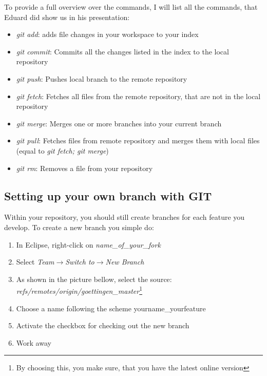 To provide a full overview over the commands, I will list all the commands, that Eduard did show us in his presentation:
\begin{itemize}
 \item \emph{git add}: adds file changes in your workspace to your index
 \item \emph{git commit}: Commits all the changes listed in the index to the local repository
 \item \emph{git push}: Pushes local branch to the remote repository
 \item \emph{git fetch}: Fetches all files from the remote repository, that are not in the local repository
 \item \emph{git merge}: Merges one or more branches into your current branch
 \item \emph{git pull}: Fetches files from remote repository and merges them with local files (equal to \emph{git fetch; git merge})
 \item \emph{git rm}: Removes a file from your repository 
\end{itemize}
\newpage
\subsection{Setting up your own branch with GIT}
Within your repository, you should still create branches for each feature you develop.
To create a new branch you simple do:
\begin{enumerate}
 \item In Eclipse, right-click on \emph{name\_of\_your\_fork}
 \item Select \emph{Team}$\rightarrow$\emph{Switch to}$\rightarrow$\emph{New Branch} 
 \item As shown in the picture bellow, select the source:\\ \emph{refs/remotes/origin/goettingen\_master}\footnote{By choosing this, you make sure, that you have the latest online version} 
 \item Choose a name following the scheme yourname\_yourfeature
 \item Activate the checkbox for checking out the new branch
 \item Work away
\end{enumerate}

